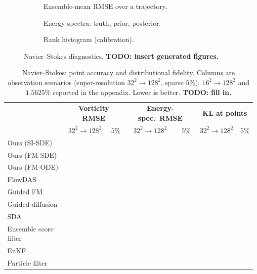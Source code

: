 \begin{figure}[ht]
    \centering
    \begin{subfigure}{0.32\linewidth}\centering
        \caption{Ensemble-mean RMSE over a trajectory.}\label{fig:ns_rmse}
    \end{subfigure}\hfill
    \begin{subfigure}{0.32\linewidth}\centering
        \caption{Energy spectra: truth, prior, posterior.}\label{fig:ns_spectrum}
    \end{subfigure}\hfill
    \begin{subfigure}{0.32\linewidth}\centering
        \caption{Rank histogram (calibration).}\label{fig:ns_rank}
    \end{subfigure}
    \caption{Navier--Stokes diagnostics. \textbf{TODO: insert generated figures.}}
    \label{fig:ns_diagnostics}
\end{figure}

\begin{table}[ht]
    \centering
    \small
    \caption{Navier--Stokes: point accuracy and distributional fidelity. Columns are observation scenarios (super-resolution $32^2\!\to\!128^2$, sparse $5\%$); $16^2\!\to\!128^2$ and $1.5625\%$ reported in the appendix. Lower is better. \textbf{TODO: fill in.}}
    \label{tab:ns_accuracy}
    \begin{tabular}{l|cc|cc|cc}
        \toprule
        & \multicolumn{2}{c|}{\textbf{Vorticity RMSE}}
        & \multicolumn{2}{c|}{\textbf{Energy-spec.\ RMSE}}
        & \multicolumn{2}{c}{\textbf{KL at points}} \\
        & $32^2\!\to\!128^2$ & $5\%$ & $32^2\!\to\!128^2$ & $5\%$ & $32^2\!\to\!128^2$ & $5\%$ \\
        \midrule
        Ours (SI-SDE) & & & & & & \\
        Ours (FM-SDE) & & & & & & \\
        Ours (FM-ODE) & & & & & & \\
        \midrule
        FlowDAS \cite{chen_flowdas_2025} & & & & & & \\
        Guided FM \cite{yan_fig_2024} & & & & & & \\
        Guided diffusion \cite{chung_diffusion_2023} & & & & & & \\
        SDA \cite{rozet_score-based_2023} & & & & & & \\
        Ensemble score filter \cite{bao_ensemble_2024} & & & & & & \\
        EnKF \cite{evensen_data_2022} & & & & & & \\
        Particle filter \cite{carrassi_data_2018} & & & & & & \\
        \bottomrule
    \end{tabular}
\end{table}

